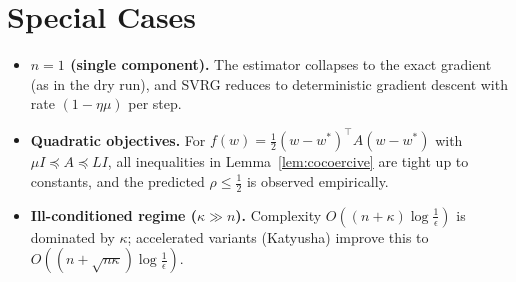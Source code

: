 \documentclass{article}
\begin{document}
\section*{Special Cases}
\begin{itemize}
\item \textbf{$n=1$ (single component).} The estimator collapses to the exact gradient (as in the dry run), and SVRG reduces to deterministic gradient descent with rate $(1-\eta\mu)$ per step.
\item \textbf{Quadratic objectives.} For $f(w)=\tfrac12(w-w^*)^\top A(w-w^*)$ with $\mu I \preceq A \preceq L I$, all inequalities in Lemma~\ref{lem:cocoercive} are tight up to constants, and the predicted $\rho\le\tfrac12$ is observed empirically.
\item \textbf{Ill-conditioned regime ($\kappa\gg n$).} Complexity $O((n+\kappa)\log\tfrac1\epsilon)$ is dominated by $\kappa$; accelerated variants (Katyusha) improve this to $O((n+\sqrt{n\kappa})\log\tfrac1\epsilon)$.
\end{itemize}
\end{document}
